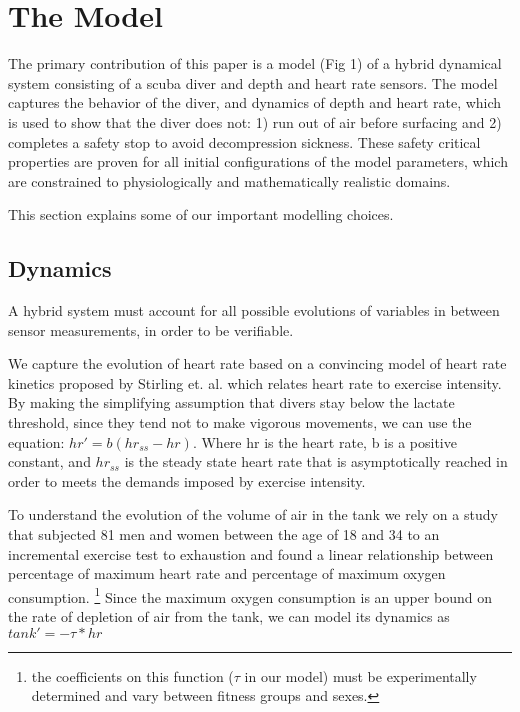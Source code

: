 \documentclass[sigconf,screen]{acmart}
\newcommand{\varheart}{hr}
\begin{document}

\section{The Model}

The primary contribution of this paper is a model (Fig 1) of a hybrid dynamical system consisting of a scuba diver and depth and heart rate sensors. The model captures the behavior of the diver, and dynamics of depth and heart rate, which is used to show that the diver does not: 1) run out of air before surfacing and 2) completes a safety stop to avoid decompression sickness. These safety critical properties are proven for all initial configurations of the model parameters, which are constrained to physiologically and mathematically realistic domains.

This section explains some of our important 
modelling choices.

\subsection{Dynamics}
A hybrid system must account for all possible evolutions of variables in between sensor measurements, in order to be verifiable. 

We capture the evolution of heart rate based on a convincing model of heart rate kinetics proposed by Stirling et. al. which relates heart rate to exercise intensity. By making the simplifying assumption that divers stay below the lactate threshold, since they tend not to make vigorous movements, we can use the equation:
$hr' = b(hr_{ss} - hr)$. Where hr is the heart rate, b is a positive constant, and $hr_{ss}$ is the steady state heart rate that is asymptotically reached in order to meets the demands imposed by exercise intensity.

To understand the evolution of the volume of air in the tank we rely on a study that subjected 81 men and women between the age of 18 and 34 to an incremental exercise test to exhaustion and found a linear relationship between percentage of maximum heart rate and percentage of maximum oxygen consumption. \footnote[2]{the coefficients on this function ($\tau$ in our model) must be experimentally determined and vary between fitness groups and sexes.} Since the maximum oxygen consumption is an upper bound on the rate of depletion of air from the tank, we can model its dynamics as $tank' = - \tau * \varheart$
\end{document}
